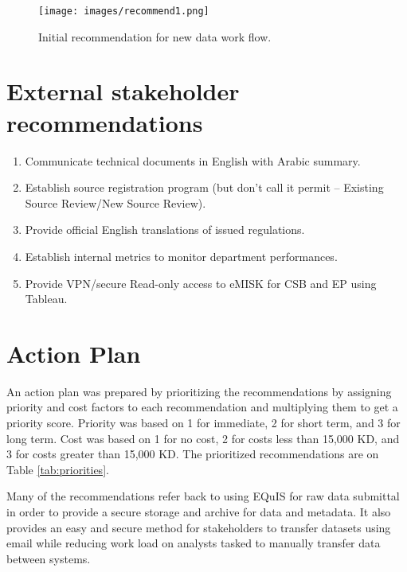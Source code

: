 \begin{figure}[H]
\centering
\texttt{[image: images/recommend1.png]} 
\caption{Initial recommendation for new data work flow.}
\label{fig:recommend1}
\end{figure}

\section{External stakeholder recommendations}
\begin{enumerate}
\item Communicate technical documents in English with Arabic summary.
\item Establish source registration program (but don’t call it permit – Existing Source Review/New Source Review).
\item Provide official English translations of issued regulations.
\item Establish internal metrics to monitor department performances.
\item Provide VPN/secure Read-only access to eMISK for CSB and EP using Tableau.
\end{enumerate}

\section{Action Plan}

An action plan was prepared by prioritizing the recommendations by assigning priority and cost factors to each recommendation and multiplying them to get a priority score. Priority was based on 1 for immediate, 2 for short term, and 3 for long term. Cost was based on 1 for no cost, 2 for costs less than 15,000 KD, and 3 for costs greater than 15,000 KD. The prioritized recommendations are on Table \ref{tab:priorities}.

Many of the recommendations refer back to using EQuIS for raw data submittal in order to provide a secure storage and archive for data and metadata. It also provides an easy and secure method for stakeholders to transfer datasets using email while reducing work load on analysts tasked to manually transfer data between systems.


